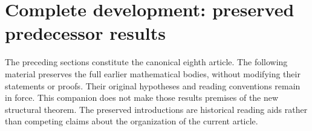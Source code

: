 \newif\ifcomplete\completetrue


\clearpage
\section*{Complete development: preserved predecessor results}
The preceding sections constitute the canonical eighth article.
The following material preserves the full earlier mathematical bodies,
without modifying their statements or proofs. Their original hypotheses
and reading conventions remain in force. This companion does not make
those results premises of the new structural theorem. The preserved
introductions are historical reading aids rather than competing claims
about the organization of the current article.



















